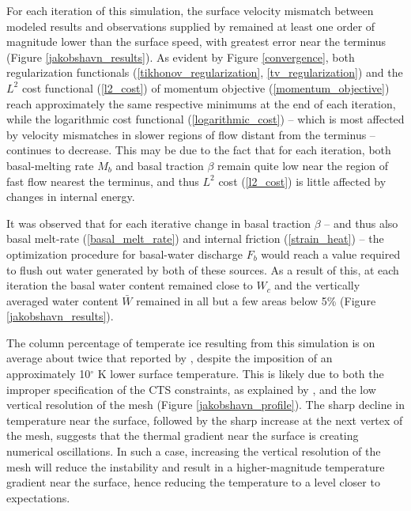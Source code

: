 For each iteration of this simulation, the surface velocity mismatch between modeled results and observations supplied by \citet{rignot_2012} remained at least one order of magnitude lower than the surface speed, with greatest error near the terminus (Figure \ref{jakobshavn_results}).  As evident by Figure \ref{convergence}, both regularization functionals (\ref{tikhonov_regularization}, \ref{tv_regularization}) and the $L^2$ cost functional (\ref{l2_cost}) of momentum objective (\ref{momentum_objective}) reach approximately the same respective minimums at the end of each iteration, while the logarithmic cost functional (\ref{logarithmic_cost}) -- which is most affected by velocity mismatches in slower regions of flow distant from the terminus -- continues to decrease.  This may be due to the fact that for each iteration, both basal-melting rate $M_b$ and basal traction $\beta$ remain quite low near the region of fast flow nearest the terminus, and thus $L^2$ cost (\ref{l2_cost}) is little affected by changes in internal energy.

It was observed that for each iterative change in basal traction $\beta$ -- and thus also basal melt-rate (\ref{basal_melt_rate}) and internal friction (\ref{strain_heat}) -- the optimization procedure for basal-water discharge $F_b$ would reach a value required to flush out water generated by both of these sources.  As a result of this, at each iteration the basal water content remained close to $W_c$ and the vertically averaged water content $\bar{W}$ remained in all but a few areas below 5\% (Figure \ref{jakobshavn_results}).

The column percentage of temperate ice resulting from this simulation is on average about twice that reported by \citet{luethi_2002}, despite the imposition of an approximately 10$^{\circ}$ K lower surface temperature.  This is likely due to both the improper specification of the CTS constraints, as explained by \citet{blatter_2015}, and the low vertical resolution of the mesh (Figure \ref{jakobshavn_profile}).  The sharp decline in temperature near the surface, followed by the sharp increase at the next vertex of the mesh, suggests that the thermal gradient near the surface is creating numerical oscillations.  In such a case, increasing the vertical resolution of the mesh will reduce the instability and result in a higher-magnitude temperature gradient near the surface, hence reducing the temperature to a level closer to expectations.

